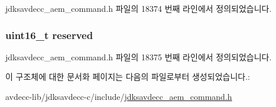 jdksavdecc\+\_\+aem\+\_\+command.\+h 파일의 18374 번째 라인에서 정의되었습니다.

\subsubsection[{\texorpdfstring{reserved}{reserved}}]{\setlength{\rightskip}{0pt plus 5cm}uint16\+\_\+t reserved}\hypertarget{structjdksavdecc__aem__command__decrement__control_a5a6ed8c04a3db86066924b1a1bf4dad3}{}\label{structjdksavdecc__aem__command__decrement__control_a5a6ed8c04a3db86066924b1a1bf4dad3}


jdksavdecc\+\_\+aem\+\_\+command.\+h 파일의 18375 번째 라인에서 정의되었습니다.



이 구조체에 대한 문서화 페이지는 다음의 파일로부터 생성되었습니다.\+:\begin{DoxyCompactItemize}
\item 
avdecc-\/lib/jdksavdecc-\/c/include/\hyperlink{jdksavdecc__aem__command_8h}{jdksavdecc\+\_\+aem\+\_\+command.\+h}\end{DoxyCompactItemize}
